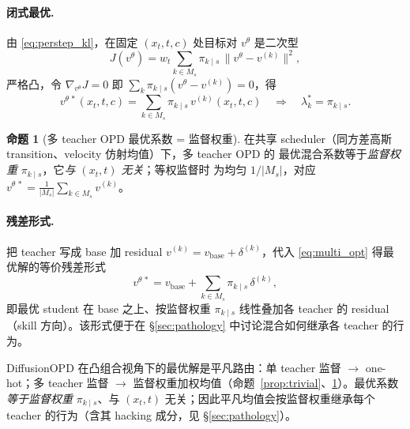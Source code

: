 \documentclass[11pt,a4paper]{article}
\newcommand{\base}{\mathrm{base}}
\newcommand{\stu}{\theta}
\theoremstyle{definition}
\newtheorem{proposition}{命题}
\begin{document}
\paragraph{闭式最优.}
由 \eqref{eq:perstep_kl}，在固定 $(x_t,t,c)$ 处目标对 $v^\stu$ 是二次型
\begin{equation}
J(v^\stu)=w_t\sum_{k\in M_s}\pi_{k\mid s}\,\big\|v^\stu-v^{(k)}\big\|^2 ,
\end{equation}
严格凸，令 $\nabla_{v^\stu}J=0$ 即 $\sum_k\pi_{k\mid s}(v^\stu-v^{(k)})=0$，得
\begin{equation}
\boxed{\,v^{\stu\,*}(x_t,t,c)=\sum_{k\in M_s}\pi_{k\mid s}\,v^{(k)}(x_t,t,c)
\quad\Longrightarrow\quad \lambda^*_k=\pi_{k\mid s}.\,}
\label{eq:multi_opt}
\end{equation}

\begin{proposition}[多 teacher OPD 最优系数 = 监督权重]
\label{prop:multi}
在共享 scheduler（同方差高斯 transition、velocity 仿射均值）下，多 teacher OPD 的
最优混合系数等于\emph{监督权重} $\pi_{k\mid s}$，它\emph{与 $(x_t,t)$ 无关}；等权监督时
为均匀 $1/|M_s|$，对应 $v^{\stu\,*}=\tfrac{1}{|M_s|}\sum_{k\in M_s}v^{(k)}$。
\end{proposition}

\paragraph{残差形式.}
把 teacher 写成 base 加 residual $v^{(k)}=v_{\base}+\delta^{(k)}$，代入
\eqref{eq:multi_opt} 得最优解的等价残差形式
\begin{equation}
v^{\stu\,*}=v_{\base}+\sum_{k\in M_s}\pi_{k\mid s}\,\delta^{(k)} ,
\label{eq:resid_form}
\end{equation}
即最优 student 在 base 之上、按监督权重 $\pi_{k\mid s}$ 线性叠加各 teacher 的 residual
（skill 方向）。该形式便于在 \S\ref{sec:pathology} 中讨论混合如何继承各 teacher 的行为。

\begin{tcolorbox}[colback=yellow!5,colframe=yellow!60!black,title=\textbf{本节小结}]
DiffusionOPD 在凸组合视角下的最优解是平凡路由：单 teacher 监督 $\to$ one-hot；多 teacher
监督 $\to$ 监督权重加权均值（命题~\ref{prop:trivial}、\ref{prop:multi}）。最优系数
\emph{等于监督权重} $\pi_{k\mid s}$、与 $(x_t,t)$ 无关；因此平凡均值会按监督权重继承每个
teacher 的行为（含其 hacking 成分，见 \S\ref{sec:pathology}）。
\end{tcolorbox}

\end{document}
